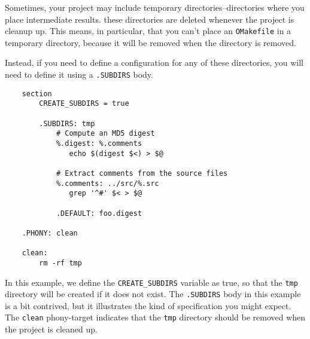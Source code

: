 Sometimes, your project may include temporary directories--directories where you place intermediate
results.  these directories are deleted whenever the project is cleanup up.  This means, in
particular, that you can't place an \verb+OMakefile+ in a temporary directory, because it will be
removed when the directory is removed.

Instead, if you need to define a configuration for any of these directories, you will need to define
it using a \verb+.SUBDIRS+ body.

\begin{verbatim}
    section
        CREATE_SUBDIRS = true

        .SUBDIRS: tmp
            # Compute an MD5 digest
            %.digest: %.comments
               echo $(digest $<) > $@

            # Extract comments from the source files
            %.comments: ../src/%.src
               grep '^#' $< > $@

            .DEFAULT: foo.digest

    .PHONY: clean

    clean:
        rm -rf tmp        
\end{verbatim}

In this example, we define the \verb+CREATE_SUBDIRS+ variable as true, so that the \verb+tmp+
directory will be created if it does not exist.  The \verb+.SUBDIRS+ body in this example is a bit
contrived, but it illustrates the kind of specification you might expect.  The \verb+clean+
phony-target indicates that the \verb+tmp+ directory should be removed when the project is cleaned
up.

